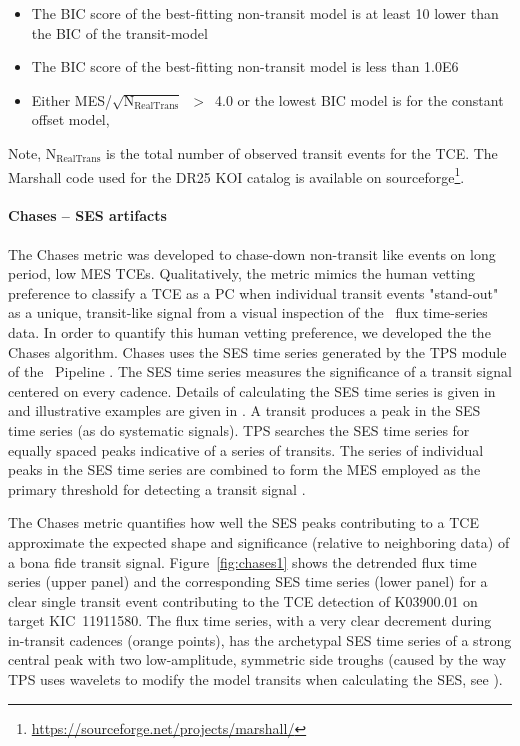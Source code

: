 \begin{itemize}
\item The BIC score of the best-fitting non-transit model is at least 10 lower than the BIC of the transit-model
\item The BIC score of the best-fitting non-transit model is less than 1.0E6
\item Either MES/$\sqrt{\textrm{N}_{\textrm{RealTrans}}}$~$>$~4.0 or the lowest BIC model is for the constant offset model, 
\end{itemize}

Note, N$_{\textrm{RealTrans}}$ is the total number of observed transit events for the TCE. The Marshall code used for the DR25 KOI catalog is available on sourceforge\footnote{ \url{https://sourceforge.net/projects/marshall/}}.


\paragraph{Chases -- SES artifacts}
\label{s:chases}

The Chases metric was developed to chase-down non-transit like events on long period, low MES TCEs. Qualitatively, the metric mimics the human vetting preference to classify a TCE as a PC when individual transit events "stand-out" as a unique, transit-like signal from a visual inspection of the \kepler\ flux time-series data.  In order to quantify this human vetting preference, we developed the the Chases algorithm. Chases uses the SES time series generated by the TPS module of the \kepler\ Pipeline \citep{JenkinsKDPH}.  The SES time series measures the significance of a transit signal centered on every cadence.  Details of calculating the SES time series is given in \citet{Jenkins2002a} and illustrative examples are given in \citet{Tenenbaum2012}. A transit produces a peak in the SES time series (as do systematic signals). TPS searches the SES time series for equally spaced peaks indicative of a series of transits. The series of individual peaks in the SES time series are combined to form the MES employed as the primary threshold for detecting a transit signal \citep{Jenkins2002a,Twicken2016,JenkinsKDPH}.  


The Chases metric quantifies how well the SES peaks contributing to a TCE approximate the expected shape and significance (relative to neighboring data) of a bona fide transit signal.  Figure~\ref{fig:chases1} shows the detrended flux time series (upper panel) and the corresponding SES time series (lower panel) for a clear single transit event contributing to the TCE detection of K03900.01 on target KIC~11911580.  The flux time series, with a very clear decrement during in-transit cadences (orange points), has the archetypal SES time series of a strong central peak with two low-amplitude, symmetric side troughs (caused by the way TPS uses wavelets to modify the model transits when calculating the SES, see \citealt{JenkinsKDPH}). 

